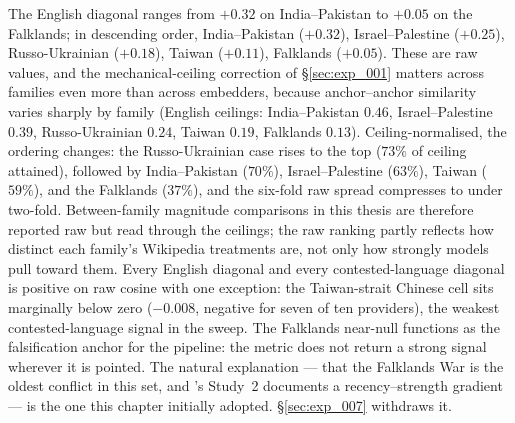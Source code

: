 The English diagonal ranges from $+0.32$ on India--Pakistan to
$+0.05$ on the Falklands; in descending order, India--Pakistan
($+0.32$), Israel--Palestine ($+0.25$), Russo-Ukrainian ($+0.18$),
Taiwan ($+0.11$), Falklands ($+0.05$). These are raw values, and
the mechanical-ceiling correction of \S\ref{sec:exp_001} matters
across families even more than across embedders, because
anchor--anchor similarity varies sharply by family (English
ceilings: India--Pakistan $0.46$, Israel--Palestine $0.39$,
Russo-Ukrainian $0.24$, Taiwan $0.19$, Falklands $0.13$).
Ceiling-normalised, the ordering changes: the Russo-Ukrainian case
rises to the top ($73\%$ of ceiling attained), followed by
India--Pakistan ($70\%$), Israel--Palestine ($63\%$), Taiwan
($59\%$), and the Falklands ($37\%$), and the six-fold raw spread
compresses to under two-fold. Between-family magnitude comparisons
in this thesis are therefore reported raw but read through the
ceilings; the raw ranking partly reflects how distinct each
family's Wikipedia treatments are, not only how strongly models
pull toward them. Every English diagonal and
every contested-language diagonal is positive on raw cosine with
one exception: the Taiwan-strait Chinese cell sits marginally below
zero ($-0.008$, negative for seven of ten providers), the weakest
contested-language signal in the sweep. The Falklands near-null
functions as the falsification
anchor for the pipeline: the metric does not return a strong signal
wherever it is pointed. The natural explanation --- that the
Falklands War is the oldest conflict in this set, and
\citet{oeberst2020wikipedia}'s Study~2 documents a
recency--strength gradient --- is the one this chapter initially
adopted. \S\ref{sec:exp_007} withdraws it.

